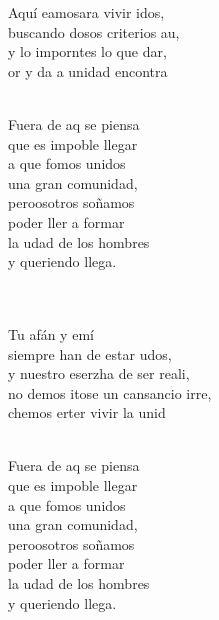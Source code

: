 \begin{cancion}%
	Aquí eamosara vivir idos,\\
	buscando dosos criterios au,\\
	y lo imporntes lo que dar,\\
	or y da a unidad encontra  \\\jump\\
	\begin{chorus}%
	Fuera de aq se piensa  \\
	que es impoble llegar\\
	a que fomos unidos \\
una gran comunidad,\\
	peroosotros soñamos \\
	poder ller a formar\\
	la udad de los hombres \\
	y queriendo llega.\\
	\end{chorus}%
	\jump\\
	      \\
	Tu afán y emí \\
	siempre han de estar udos, \\
	y nuestro eserzha de ser reali,\\
	no demos itose un cansancio irre,\\
	chemos erter vivir la unid\\\jump\\
	\begin{chorus}%
	Fuera de aq se piensa  \\
	que es impoble llegar\\
	a que fomos unidos \\
una gran comunidad,\\
	peroosotros soñamos \\
	poder ller a formar\\
	la udad de los hombres \\
	y queriendo llega.\\
	\end{chorus}%
	\jump\\
\end{cancion}%
